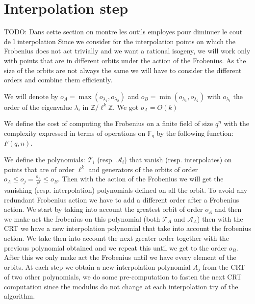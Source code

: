 \documentclass{lms}
\newcommand{\todo}[1]{{\color{red}TODO: #1}}
\begin{document}

\section{Interpolation step}
\label{sec:interpolation}
\todo{Dans cette section on montre les outils employes pour diminuer le cout de l interpolation}
Since we consider for the interpolation points on which the Frobenius does not act trivially and we want a rational isogeny, we will work only with points that are in different orbits under the action of the Frobenius. As the size of the orbits are not always the same we will have to consider the different orders and combine them efficiently.

\begin{defi}
We will denote by $o_A=\max(o_{\lambda_1},o_{\lambda_2})$ and $o_B=\min(o_{\lambda_1},o_{\lambda_2})$ with $o_{\lambda_i}$ the order of the eigenvalue $\lambda_i$ in $\mathbb{Z}/\ell^k\mathbb{Z}$. We got $o_A=O(k)$
\end{defi}

\begin{defi}
We define the cost of computing the Frobenius on a finite field of size $q^{n}$ with the complexity expressed in terms of operations on $\mathbb{F}_q$ by the following function: $F(q,n)$.
\end{defi}

We define the polynomials: $\mathcal{T}_i$ (resp. $\mathcal{A}_i$) that vanish (resp. interpolates) on points that are of order $\ell^k$ and generators of the orbits of order  $o_A \leqslant o_j=\frac{o_A}{\ell^j} \leqslant o_B$. Then with the action of the Frobenius we will get the vanishing (resp. interpolation) polynomials defined on all the orbit. To avoid any redundant Frobenius action we have to add a different order after a Frobenius action. %
\newline
We start by taking into account the greatest orbit of order $o_A$ and then we make act the frobenius on this polynomial (both $\mathcal{T}_A$ and $\mathcal{A}_A$) then with the CRT we have a new interpolation polynomial that take into account the frobenius action. We take then into account the next greater order together with the previous polynomial obtained and we repeat this until we get to the order $o_B$. After this we only make act the Frobenius until we have every element of the orbits.
\newline
At each step we obtain a new interpolation polynomial $A_j$ from the CRT of two other polynomials, we do some pre-computation to fasten the next CRT computation since the modulus do not change at each interpolation try of the algorithm.
\end{document}

